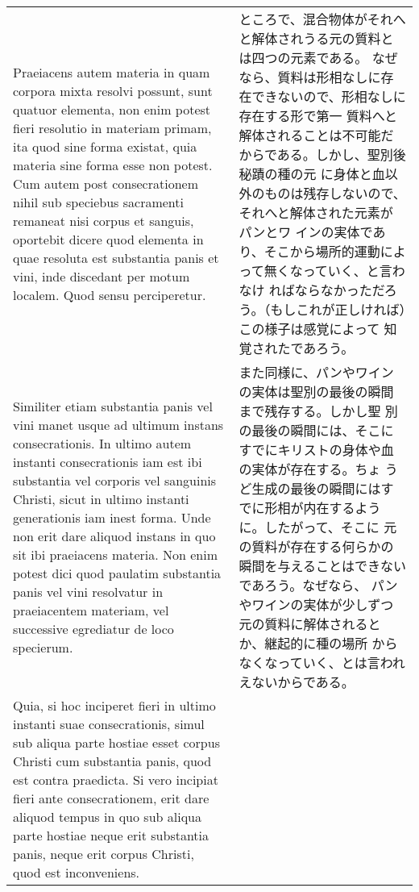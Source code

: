 \documentclass[10pt]{jsarticle} %
\begin{document}
\begin{longtable}{p{21em}p{21em}}
\\



Praeiacens autem materia in quam corpora mixta resolvi possunt, sunt
quatuor elementa, non enim potest fieri resolutio in materiam primam,
ita quod sine forma existat, quia materia sine forma esse non
potest. Cum autem post consecrationem nihil sub speciebus sacramenti
remaneat nisi corpus et sanguis, oportebit dicere quod elementa in
quae resoluta est substantia panis et vini, inde discedant per motum
localem. Quod sensu perciperetur.



&

ところで、混合物体がそれへと解体されうる元の質料とは四つの元素である。
なぜなら、質料は形相なしに存在できないので、形相なしに存在する形で第一
質料へと解体されることは不可能だからである。しかし、聖別後秘蹟の種の元
に身体と血以外のものは残存しないので、それへと解体された元素がパンとワ
インの実体であり、そこから場所的運動によって無くなっていく、と言わなけ
ればならなかっただろう。（もしこれが正しければ）この様子は感覚によって
知覚されたであろう。


\\


Similiter etiam substantia panis vel vini manet usque ad ultimum
instans consecrationis. In ultimo autem instanti consecrationis iam
est ibi substantia vel corporis vel sanguinis Christi, sicut in ultimo
instanti generationis iam inest forma. Unde non erit dare aliquod
instans in quo sit ibi praeiacens materia. Non enim potest dici quod
paulatim substantia panis vel vini resolvatur in praeiacentem
materiam, vel successive egrediatur de loco specierum.


&

また同様に、パンやワインの実体は聖別の最後の瞬間まで残存する。しかし聖
別の最後の瞬間には、そこにすでにキリストの身体や血の実体が存在する。ちょ
うど生成の最後の瞬間にはすでに形相が内在するように。したがって、そこに
元の質料が存在する何らかの瞬間を与えることはできないであろう。なぜなら、
パンやワインの実体が少しずつ元の質料に解体されるとか、継起的に種の場所
からなくなっていく、とは言われえないからである。



\\

Quia, si hoc inciperet fieri in ultimo instanti suae consecrationis,
simul sub aliqua parte hostiae esset corpus Christi cum substantia
panis, quod est contra praedicta. Si vero incipiat fieri ante
consecrationem, erit dare aliquod tempus in quo sub aliqua parte
hostiae neque erit substantia panis, neque erit corpus Christi, quod
est inconveniens.




\end{longtable}
\end{document}
